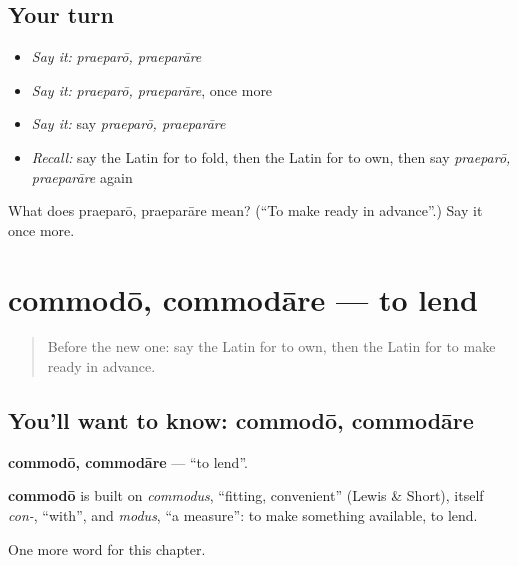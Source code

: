 \subsection*{Your turn}
\begin{itemize}
\raggedright
  \item \emph{Say it:} \emph{praeparō, praeparāre}
  \item \emph{Say it:} \emph{praeparō, praeparāre}, once more
  \item \emph{Say it:} say \emph{praeparō, praeparāre}
  \item \emph{Recall:} say the Latin for to fold, then the Latin for to own, then say \emph{praeparō, praeparāre} again
\end{itemize}

\begin{tcolorbox}[breakable,colback=teal!4,colframe=teal!35!black,title={Before you move on}]
What does praeparō, praeparāre mean? (\textquotedblleft{}To make ready in advance\textquotedblright{}.) Say it once more.
\end{tcolorbox}
\section[commodō, commodāre]{commodō, commodāre — to lend}

\label{lesson:LA-C168-commodo}



\begin{quote}
Before the new one: say the Latin for to own, then the Latin for to make ready in advance.
\end{quote}

\subsection*{You'll want to know: commodō, commodāre}
\textbf{commodō, commodāre} — \textquotedblleft{}to lend\textquotedblright{}.

\begin{cousinweb}
\textbf{commodō} is built on \emph{commodus}, \textquotedblleft{}fitting, convenient\textquotedblright{} (Lewis \& Short), itself \emph{con-}, \textquotedblleft{}with\textquotedblright{}, and \emph{modus}, \textquotedblleft{}a measure\textquotedblright{}: to make something available, to lend.
\end{cousinweb}

\begin{grammarlens}[title={What you've built}]
One more word for this chapter.
\end{grammarlens}


